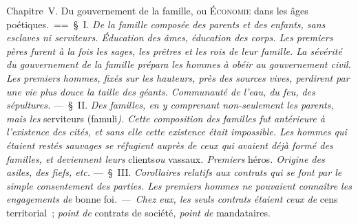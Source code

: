 \documentclass[french,twoside]{book} %
\begin{document}
Chapitre V. Du gouvernement de la famille, ou {\scshape Économie} dans les âges poétiques. == § I. {\itshape De la famille}  {\itshape composée des parents et des enfants, sans esclaves ni serviteurs. Éducation des âmes, éducation des corps. Les premiers pères furent à la fois les sages, les prêtres et les rois de leur famille. La sévérité du gouvernement de la famille prépara les hommes à obéir au gouvernement civil. Les premiers hommes, fixés sur les hauteurs, près des sources vives, perdirent par une vie plus douce la taille des géants. Communauté de l’eau, du feu, des sépultures.} — § II. {\itshape Des familles, en y comprenant non-seulement les parents, mais les} serviteurs (famuli{\itshape ). Cette composition des familles fut antérieure à l’existence des cités, et sans elle cette existence était impossible. Les hommes qui étaient restés sauvages se réfugient auprès de ceux qui avaient déjà formé des familles, et deviennent leurs} clients{\itshape  ou} vassaux{\itshape . Premiers} héros{\itshape . Origine des asiles, des fiefs, etc.} — § III. {\itshape Corollaires relatifs aux contrats qui se font par le simple consentement des parties. Les premiers hommes ne pouvaient connaître les engagements de} bonne foi{\itshape . — Chez eux, les seuls contrats étaient ceux de} cens territorial ; {\itshape point de} contrats de société{\itshape , point de} mandataires.\par
\end{document}
